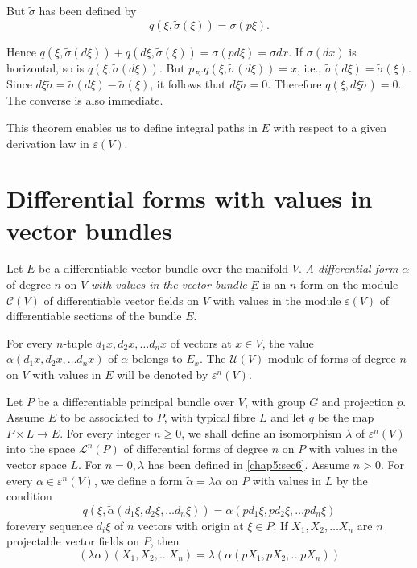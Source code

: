 But $\tilde{\sigma}$ has been defined by 
$$
q(\xi , \tilde{\sigma} (\xi)) = \sigma (p \xi). 
$$

Hence $q(\xi , \tilde{\sigma}(d \xi)) + q(d \xi , \tilde{\sigma}(\xi)) =
\sigma (pd \xi)= \sigma dx$. If $\sigma (dx)$ is horizontal, so is
$q(\xi , \tilde{\sigma} (d \xi))$. But $p_E. q(\xi , \tilde{\sigma} (d
\xi)) = x$, i.e., $\tilde{\sigma} (d \xi) = \tilde{\sigma}
(\xi)$. Since $d \xi \tilde{\sigma} = \tilde{\sigma} (d \xi) -
\tilde{\sigma} (\xi)$, it follows that $d \xi \tilde{\sigma} =
0$. Therefore $q(\xi, d \xi \tilde{\sigma}) = 0$. The converse is also
immediate. 

This theorem enables us to define integral paths in $E$ with respect
to a given derivation law in $\varepsilon (V)$. 

\section{Differential forms with values in vector bundles}\label{chap5:sec8}%

\begin{defn}\label{chap5:sec8:def5}%
  Let $E$ be a differentiable vector-bundle over the manifold
  $V$. {\em A differential form} $\alpha$ of degree $n$ on $V$ {\em
    with values in the vector bundle} $\underbar{E}$ is an $n$-form on
  the module $\mathscr{C}(V)$ of differentiable vector fields on $V$
  with values in the module $\varepsilon(V)$ of differentiable\pageoriginale
  sections of the bundle $E$. 
\end{defn}

For every $n$-tuple $d_1 x , d_2 x , \ldots d_n x$ of vectors at $x
\in V$, the value $\alpha (d_1 x, d_2 x , \ldots d_n x)$ of $\alpha$
belongs to $E_x$. The $\mathscr{U}(V)$-module of forms of degree $n$
on $V$ with values in $E$ will be denoted by $\varepsilon^n (V)$. 

Let $P$ be a differentiable principal bundle over $V$,  with  group
$G$ and projection $p$. Assume $E$ to be associated to $P$, with typical fibre
$L$ and let $q$ be the map $P \times L \to E$. For every integer $n
\ge 0$, we shall define an isomorphism $\lambda$ of $\varepsilon^n (V)$
into the space $\mathscr{L}^n (P)$ of differential forms of degree
$n$ on $P$ with values in the vector space $L$. For $ n = 0, \lambda $
has been defined in \ref{chap5:sec6}. Assume $n > 0$. For every $\alpha \in
\varepsilon^n (V)$, we define a form $\tilde{\alpha} = \lambda \alpha$
on $P$ with values in $L$ by the condition 
$$
q(\xi , \tilde{\alpha}(d_1 \xi , d_2 \xi , \ldots d_n \xi)) = \alpha
(pd_1 \xi , pd_2 \xi , \ldots pd_n \xi) 
$$ 
for\pageoriginale every sequence $d_i \xi$ of $n$ vectors with origin at $\xi \in
P$. If $X_1, X_2, \ldots X_n$ are $n$ projectable vector fields on
$P$, then 
$$
(\lambda \alpha) (X_1, X_2, \ldots X_n) = \lambda(\alpha (pX_1, pX_2 ,
\ldots pX_n)) 
$$

